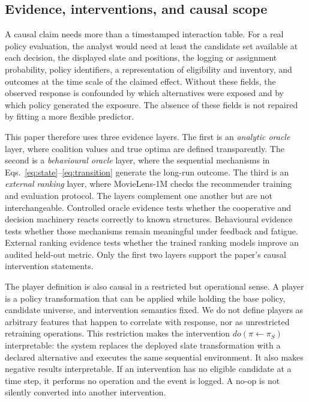 \documentclass[pdflatex,sn-mathphys-num]{sn-jnl}
\theoremstyle{thmstyleone}
\theoremstyle{thmstyletwo}
\theoremstyle{thmstylethree}
\newcommand{\Policy}{\pi}
\begin{document}
\subsection{Evidence, interventions, and causal scope}

A causal claim needs more than a timestamped interaction table. For a real policy evaluation, the analyst would need at least the candidate set available at each decision, the displayed slate and positions, the logging or assignment probability, policy identifiers, a representation of eligibility and inventory, and outcomes at the time scale of the claimed effect. Without these fields, the observed response is confounded by which alternatives were exposed and by which policy generated the exposure. The absence of these fields is not repaired by fitting a more flexible predictor.

This paper therefore uses three evidence layers. The first is an \emph{analytic oracle} layer, where coalition values and true optima are defined transparently. The second is a \emph{behavioural oracle} layer, where the sequential mechanisms in Eqs.~\eqref{eq:state}--\eqref{eq:transition} generate the long-run outcome. The third is an \emph{external ranking} layer, where MovieLens-1M checks the recommender training and evaluation protocol. The layers complement one another but are not interchangeable. Controlled oracle evidence tests whether the cooperative and decision machinery reacts correctly to known structures. Behavioural evidence tests whether those mechanisms remain meaningful under feedback and fatigue. External ranking evidence tests whether the trained ranking models improve an audited held-out metric. Only the first two layers support the paper's causal intervention statements.

The player definition is also causal in a restricted but operational sense. A player is a policy transformation that can be applied while holding the base policy, candidate universe, and intervention semantics fixed. We do not define players as arbitrary features that happen to correlate with response, nor as unrestricted retraining operations. This restriction makes the intervention $do(\Policy\leftarrow\Policy_S)$ interpretable: the system replaces the deployed slate transformation with a declared alternative and executes the same sequential environment. It also makes negative results interpretable. If an intervention has no eligible candidate at a time step, it performs no operation and the event is logged. A no-op is not silently converted into another intervention.
\end{document}
